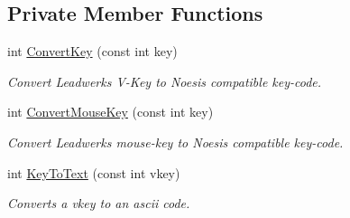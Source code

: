 \subsection*{Private Member Functions}
\begin{DoxyCompactItemize}
\item 
int \hyperlink{class_u_i_system_a609dfe50f7414f19e8fc6552807eb4e8}{Convert\-Key} (const int key)
\begin{DoxyCompactList}\small\item\em Convert Leadwerks V-\/\-Key to Noesis compatible key-\/code. \end{DoxyCompactList}\item 
int \hyperlink{class_u_i_system_aa6023e6a0d3b6ce665ae4eabb9ef34f7}{Convert\-Mouse\-Key} (const int key)
\begin{DoxyCompactList}\small\item\em Convert Leadwerks mouse-\/key to Noesis compatible key-\/code. \end{DoxyCompactList}\item 
int \hyperlink{class_u_i_system_ab10ce968219079f159b53a035e115cee}{Key\-To\-Text} (const int vkey)
\begin{DoxyCompactList}\small\item\em Converts a vkey to an ascii code. \end{DoxyCompactList}\end{DoxyCompactItemize}
